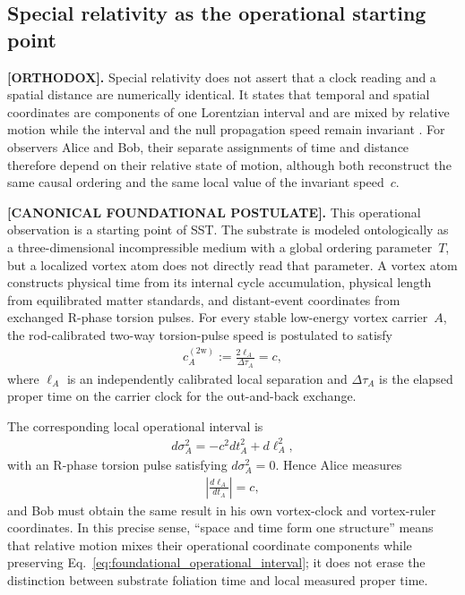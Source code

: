 \documentclass[11pt]{article}
\theoremstyle{definition}
\theoremstyle{plain}
\theoremstyle{remark}
\begin{document}
    \subsection{Special relativity as the operational starting point}
        \label{subsec:sr_operational_origin}

        \textbf{[ORTHODOX].}
        Special relativity does not assert that a clock reading and a spatial distance are numerically identical. It states that temporal and spatial coordinates are components of one Lorentzian interval and are mixed by relative motion while the interval and the null propagation speed remain invariant \cite{Einstein1905}. For observers Alice and Bob, their separate assignments of time and distance therefore depend on their relative state of motion, although both reconstruct the same causal ordering and the same local value of the invariant speed~\(c\).

        \textbf{[CANONICAL FOUNDATIONAL POSTULATE].}
        This operational observation is a starting point of SST. The substrate is modeled ontologically as a three-dimensional incompressible medium with a global ordering parameter~\(T\), but a localized vortex atom does not directly read that parameter. A vortex atom constructs physical time from its internal cycle accumulation, physical length from equilibrated matter standards, and distant-event coordinates from exchanged R-phase torsion pulses. For every stable low-energy vortex carrier~\(A\), the rod-calibrated two-way torsion-pulse speed is postulated to satisfy
        \begin{align}
            c_A^{(2\mathrm w)}
            :=
            \frac{2\ell_A}{\Delta\tau_A}
            = c,
            \label{eq:foundational_vortex_atom_two_way_c}
        \end{align}
        where \(\ell_A\) is an independently calibrated local separation and \(\Delta\tau_A\) is the elapsed proper time on the carrier clock for the out-and-back exchange.

        The corresponding local operational interval is
        \begin{align}
            d\sigma_A^2
            =
            -c^2dt_A^2+d\ell_A^2,
            \label{eq:foundational_operational_interval}
        \end{align}
        with an R-phase torsion pulse satisfying \(d\sigma_A^2=0\). Hence Alice measures
        \begin{align}
            \left|\frac{d\ell_A}{dt_A}\right|=c,
        \end{align}
        and Bob must obtain the same result in his own vortex-clock and vortex-ruler coordinates. In this precise sense, ``space and time form one structure'' means that relative motion mixes their operational coordinate components while preserving Eq.~\eqref{eq:foundational_operational_interval}; it does not erase the distinction between substrate foliation time and local measured proper time.
\end{document}
